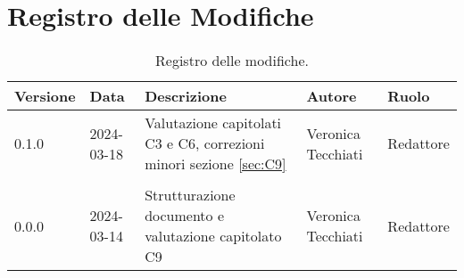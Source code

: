\section*{Registro delle Modifiche}
\begin{table}[ht!]	
		\centering
		\begin{tabular}{p{1.2cm} p{2cm} p{6cm} p{3cm} p{2cm}}
			\toprule
			\textbf{Versione}& \textbf{Data} & \textbf{Descrizione} & \textbf{Autore} & \textbf{Ruolo} \\
			\midrule
                0.1.0 & 2024-03-18 & Valutazione capitolati C3 e C6, correzioni minori sezione \ref{sec:C9} & Veronica Tecchiati & Redattore 
   \\\\ %
			0.0.0 & 2024-03-14 & Strutturazione documento e valutazione capitolato C9 & Veronica Tecchiati & Redattore \\
			\bottomrule
		\end{tabular}
		\caption{Registro delle modifiche.}
		\label{table:Registro delle modifiche}
\end{table}